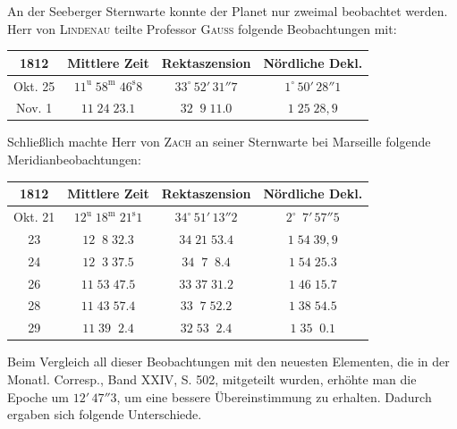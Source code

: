\par\indent An der Seeberger Sternwarte konnte der Planet nur zweimal beobachtet werden. Herr von \textsc{Lindenau} teilte Professor \textsc{Gauss} folgende Beobachtungen mit:

\begin{center}
\fontsize{10}{12}\selectfont\setlength{\tabcolsep}{4pt}\renewcommand{\arraystretch}{1.15}\begin{tabular}{|c|c|c|c|}
\hline
1812 & Mittlere Zeit & Rektaszension & Nördliche Dekl. \\
\hline
Okt. 25 & $11^{\mathrm u}\;58^{\mathrm m}\;46^{\mathrm s}8$ & $33^\circ\,52'\,31''7$ & $1^\circ\,50'\,28''1$ \\
Nov. 1 & $11\;24\;23.1$ & $32\;\;9\;11.0$ & $1\;25\;28{,}9$ \\
\hline
\end{tabular}
\end{center}

\par\indent Schließlich machte Herr von \textsc{Zach} an seiner Sternwarte bei Marseille folgende Meridianbeobachtungen:

\begin{center}
\fontsize{10}{12}\selectfont\setlength{\tabcolsep}{4pt}\renewcommand{\arraystretch}{1.15}\begin{tabular}{|c|c|c|c|}
\hline
1812 & Mittlere Zeit & Rektaszension & Nördliche Dekl. \\
\hline
Okt. 21 & $12^{\mathrm u}\;18^{\mathrm m}\;21^{\mathrm s}1$ & $34^\circ\,51'\,13''2$ & $2^\circ\,\;7'\,57''5$ \\
23 & $12\;\;8\;32.3$ & $34\;21\;53.4$ & $1\;54\;39{,}9$ \\
24 & $12\;\;3\;37.5$ & $34\;\;7\;\;8.4$ & $1\;54\;25.3$ \\
26 & $11\;53\;47.5$ & $33\;37\;31.2$ & $1\;46\;15.7$ \\
28 & $11\;43\;57.4$ & $33\;\;7\;52.2$ & $1\;38\;54.5$ \\
29 & $11\;39\;\;2.4$ & $32\;53\;\;2.4$ & $1\;35\;\;0.1$ \\
\hline
\end{tabular}
\end{center}

\par\indent Beim Vergleich all dieser Beobachtungen mit den neuesten Elementen, die in der Monatl. Corresp., Band XXIV, S. 502, mitgeteilt wurden, erhöhte man die Epoche um $12'\,47''3$, um eine bessere Übereinstimmung zu erhalten. Dadurch ergaben sich folgende Unterschiede.

